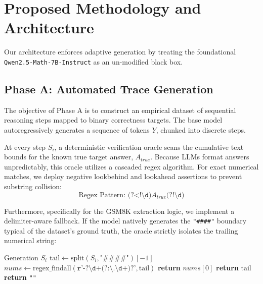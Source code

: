 \documentclass[11pt]{article}
\begin{document}
\section{Proposed Methodology and Architecture}
Our architecture enforces adaptive generation by treating the foundational \texttt{Qwen2.5-Math-7B-Instruct} as an un-modified black box. 

\subsection{Phase A: Automated Trace Generation}
\label{sec:phase_a}
The objective of Phase A is to construct an empirical dataset of sequential reasoning steps mapped to binary correctness targets. The base model autoregressively generates a sequence of tokens $Y$, chunked into discrete steps. 

At every step $S_i$, a deterministic verification oracle scans the cumulative text bounds for the known true target answer, $A_{true}$. Because LLMs format answers unpredictably, this oracle utilizes a cascaded regex algorithm. For exact numerical matches, we deploy negative lookbehind and lookahead assertions to prevent substring collision:
\begin{equation}
    \text{Regex Pattern: } \texttt{(?<!\textbackslash d)} A_{true} \texttt{(?!\textbackslash d)}
\end{equation}

Furthermore, specifically for the GSM8K extraction logic, we implement a delimiter-aware fallback. If the model natively generates the \texttt{"\#\#\#\#"} boundary typical of the dataset's ground truth, the oracle strictly isolates the trailing numerical string:
\begin{algorithm}[H]
\caption{GSM8K Ground Truth Oracle Extraction}
\label{alg:gsm_extract}
\begin{algorithmic}[1]
\REQUIRE Generation $S_i$
    \STATE $\text{tail} \leftarrow \text{split}(S_i, \texttt{"\#\#\#\#"})[-1]$
    \STATE $nums \leftarrow \text{regex\_findall}(\texttt{r'-?\textbackslash d+(?:\textbackslash .\textbackslash d+)?'}, \text{tail})$
        \STATE \textbf{return} $nums[0]$
    \ELSE
        \STATE \textbf{return} $\text{tail}$
    \ENDIF
\ENDIF
\STATE \textbf{return} \texttt{""}
\end{algorithmic}
\end{algorithm}
\end{document}

